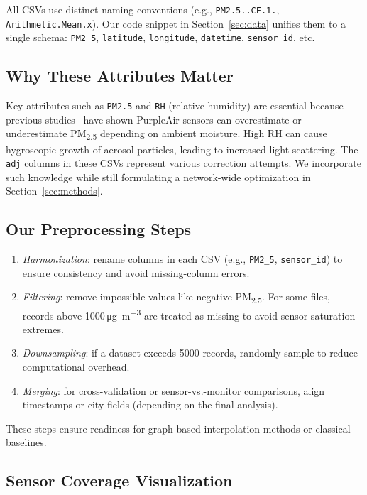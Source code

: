 \documentclass[12pt]{article}                                %
\begin{document}
All CSVs use distinct naming conventions (e.g., \texttt{PM2.5..CF.1.}, \texttt{Arithmetic.Mean.x}). 
Our code snippet in Section~\ref{sec:data} unifies them to a single schema: \texttt{PM2\_5}, 
\texttt{latitude}, \texttt{longitude}, \texttt{datetime}, \texttt{sensor\_id}, etc.

\subsection{Why These Attributes Matter}    %
Key attributes such as \texttt{PM2.5} and \texttt{RH} (relative humidity) are essential because 
previous studies~\cite{Barkjohn2022Sensors} have shown PurpleAir sensors can overestimate or 
underestimate PM\textsubscript{2.5} depending on ambient moisture. High RH can cause hygroscopic 
growth of aerosol particles, leading to increased light scattering. The \texttt{adj} columns in 
these CSVs represent various correction attempts. We incorporate such knowledge while still 
formulating a network-wide optimization in Section~\ref{sec:methods}.

\subsection{Our Preprocessing Steps}   %
\begin{enumerate}
    \item \textit{Harmonization}: rename columns in each CSV (e.g., \texttt{PM2\_5}, 
    \texttt{sensor\_id}) to ensure consistency and avoid missing-column errors.
    \item \textit{Filtering}: remove impossible values like negative PM\textsubscript{2.5}. For 
    some files, records above 1000\,\si{\micro\gram\per\cubic\meter} are treated as missing 
    to avoid sensor saturation extremes.
    \item \textit{Downsampling}: if a dataset exceeds 5000 records, randomly sample to reduce 
    computational overhead.
    \item \textit{Merging}: for cross-validation or sensor-vs.-monitor comparisons, align 
    timestamps or city fields (depending on the final analysis).
\end{enumerate}

These steps ensure readiness for graph-based interpolation methods or classical baselines.

\subsection{Sensor Coverage Visualization}
\end{document}
